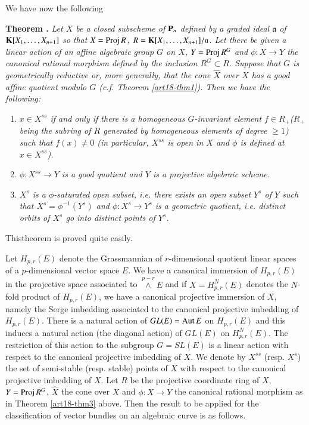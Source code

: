We have now the following

\medskip
\noindent
{\bf Theorem .\label{art18-thm3}}
{\em Let $X$ be a closed subscheme of $\mathbf{P}_{n}$ defined by a graded ideal $\mathfrak{a}$ of $\mathbf{K}[X_{1},\ldots,X_{n+1}]$ so that $X=\operatorname{\mathrm{Proj}} R$, $R=\mathbf{K}[X_{1},\ldots,X_{n+1}]/\mathfrak{a}$. Let there be given a linear action of an affine algebraic group $G$ on $X$, $Y=\operatorname{\mathrm{Proj}} R^{G}$ and $\phi:X\to Y$ the canonical rational morphism defined by the inclusion $R^{G}\subset R$. Suppose that $G$ is geometrically reductive or, more generally, that the cone $\widehat{X}$ over $X$ has a good affine quotient modulo $G$ (c.f. Theorem \ref{art18-thm1}). Then we have the following:}
\begin{enumerate}
\renewcommand{\labelenumi}{(\rm\theenumi)}
\item {\em $x\in X^{ss}$ if and only if there is a homogeneous $G$-invariant element $f\in R_{+}$($R_{+}$ being the subring of $R$ generated by homogeneous elements of degree $\geq 1$) such that $f(x)\neq 0$ (in particular, $X^{ss}$ is open in $X$ and $\phi$ is defined at $x\in X^{ss}$).}

\item {\em $\phi:X^{ss}\to Y$ is a good quotient and $Y$ is a projective algebraic scheme.}

\item {\em $X^{s}$ is a $\phi$-saturated open subset, i.e. there exists an open subset $Y^{s}$ of $Y$ such that $X^{s}=\phi^{-1}(Y^{s})$ and $\phi:X^{s}\to Y^{s}$ is a geometric quotient, i.e. distinct orbits of $X^{s}$ go into distinct points of $Y^{s}$.}
\end{enumerate}

This\pageoriginale theorem is proved quite easily.

Let $H_{p,r}(E)$ denote the Grassmannian of $r$-dimensional quotient linear spaces of a $p$-dimensional vector space $E$. We have a canonical immersion of $H_{p,r}(E)$ in the projective space associated to ${\displaystyle{\mathop{\wedge}\limits^{p-r}}}E$ and if $X=H^{N}_{p,r}(E)$ denotes the $N$-fold product of $H_{p,r}(E)$, we have a canonical projective immersion of $X$, namely the Serge imbedding associated to the canonical projective imbedding of $H_{p,r}(E)$. There is a natural action of $GL(E)=\operatorname{\mathrm{Aut}} E$ on $H_{p,r}(E)$ and this induces a natural action (the diagonal action) of $GL(E)$ on $H^{N}_{p,r}(E)$. The restriction of this action to the subgroup $G=SL(E)$ is a linear action with respect to the canonical projective imbedding of $X$. We denote by $X^{ss}$ (resp. $X^{s}$) the set of semi-stable (resp. stable) points of $X$ with respect to the canonical projective imbedding of $X$. Let $R$ be the projective coordinate ring of $X$, $Y=\operatorname{\mathrm{Proj}} R^{G}$, $\widehat{X}$ the cone over $X$ and $\phi:X\to Y$ the canonical rational morphism as in Theorem \ref{art18-thm3} above. Then the result to be applied for the classification of vector bundles on an algebraic curve is as follows.

